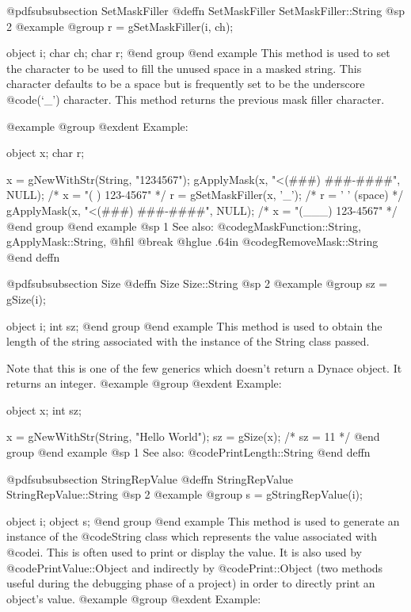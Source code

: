 @pdfsubsubsection {SetMaskFiller}
@deffn {SetMaskFiller} SetMaskFiller::String
@sp 2
@example
@group
r = gSetMaskFiller(i, ch);

object  i;
char    ch;
char    r;
@end group
@end example
This method is used to set the character to be used to fill the unused
space in a masked string.  This character defaults to be a space but is
frequently set to be the underscore @code{(`_')} character.  This method
returns the previous mask filler character.

@example
@group
@exdent Example:

object  x;
char    r;

x = gNewWithStr(String, "1234567");
gApplyMask(x, "<(###) ###-####", NULL);
      /* x = "(   ) 123-4567" */
r = gSetMaskFiller(x, '_');
      /* r = ' ' (space)      */
gApplyMask(x, "<(###) ###-####", NULL);
      /* x = "(___) 123-4567" */
@end group
@end example
@sp 1
See also:  @code{gMaskFunction::String, gApplyMask::String,}
@hfil @break @hglue .64in      @code{gRemoveMask::String}
@end deffn












@pdfsubsubsection {Size}
@deffn {Size} Size::String
@sp 2
@example
@group
sz = gSize(i);

object  i;
int     sz;
@end group
@end example
This method is used to obtain the length of the string associated with
the instance of the String class passed.

Note that this is one of the few generics which doesn't return a Dynace
object.  It returns an integer.
@example
@group
@exdent Example:

object  x;
int     sz;

x = gNewWithStr(String, "Hello World");
sz = gSize(x);
/*  sz = 11   */
@end group
@end example
@sp 1
See also:  @code{PrintLength::String}
@end deffn










@pdfsubsubsection {StringRepValue}
@deffn {StringRepValue} StringRepValue::String
@sp 2
@example
@group
s = gStringRepValue(i);

object  i;
object  s;
@end group
@end example
This method is used to generate an instance of the @code{String} class
which represents the value associated with @code{i}.  This is often
used to print or display the value.  It is also used by
@code{PrintValue::Object} and indirectly by @code{Print::Object}
(two methods useful during the debugging phase of a project)
in order to directly print an object's value.
@example
@group
@exdent Example:

